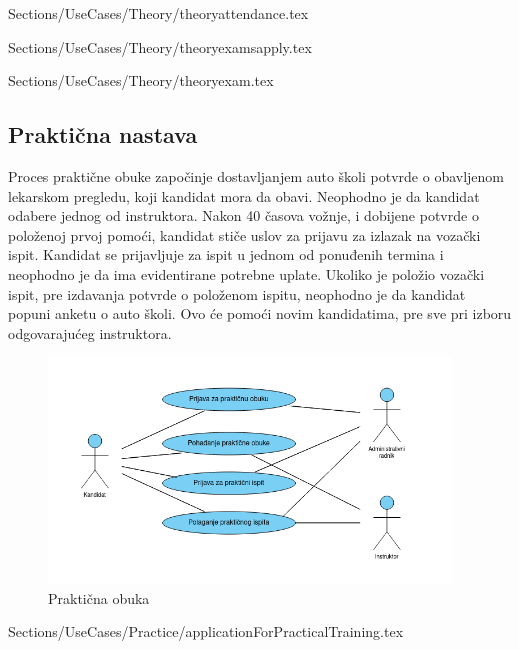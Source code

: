  {Sections/UseCases/Theory/theoryattendance.tex}

 {Sections/UseCases/Theory/theoryexamsapply.tex}

 {Sections/UseCases/Theory/theoryexam.tex}

\subsection {Praktična nastava}
Proces praktične obuke započinje dostavljanjem auto školi potvrde o obavljenom lekarskom pregledu, koji kandidat mora da obavi. Neophodno je da kandidat odabere jednog od instruktora. Nakon 40 časova vožnje, i dobijene potvrde o položenoj prvoj pomoći, kandidat stiče uslov za prijavu za izlazak na vozački ispit. Kandidat se prijavljuje za ispit u jednom od ponuđenih termina i neophodno je da ima evidentirane potrebne uplate. Ukoliko je položio vozački ispit, pre izdavanja potvrde o položenom ispitu, neophodno je da kandidat popuni anketu o auto školi. Ovo će pomoći novim kandidatima, pre sve pri izboru odgovarajućeg instruktora.


\begin{figure}[H]
    \begin{center}
        \includegraphics[width=107mm, height=60mm]{Diagrams/prakticna_obuka.png}
    \end{center}
    \caption {Praktična obuka}
    \label{usecase_praktična obuka}

\end{figure}

 {Sections/UseCases/Practice/applicationForPracticalTraining.tex}







